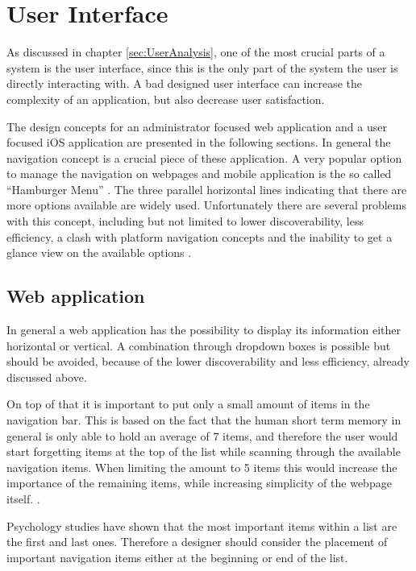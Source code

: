 \section{User Interface} %

As discussed in chapter \vref{sec:UserAnalysis}, one of the most crucial parts of a system is the user interface, since this is the only part of the system the user is directly interacting with. A bad designed user interface can increase the complexity of an application, but also decrease user satisfaction.

The design concepts for an administrator focused web application and a user focused iOS application are presented in the following sections. In general the navigation concept is a crucial piece of these application. A very popular option to manage the navigation on webpages and mobile application is the so called \enquote{Hamburger Menu} \cite{Abreu:2014aa}. The three parallel horizontal lines indicating that there are more options available are widely used. Unfortunately there are several problems with this concept, including but not limited to lower discoverability, less efficiency, a clash with platform navigation concepts and the inability to get a glance view on the available options \cite{Abreu:2014aa}.

\subsection{Web application}
\label{sec:UIConceptWeb}

In general a web application has the possibility to display its information either horizontal or vertical. A combination through dropdown boxes is possible but should be avoided, because of the lower discoverability and less efficiency, already discussed above. \cite{Crestodina:2015aa}

On top of that it is important to put only a small amount of items in the navigation bar. This is based on the fact that the human short term memory in general is only able to hold an average of 7 items, and therefore the user would start forgetting items at the top of the list while scanning through the available navigation items. When limiting the amount to 5 items this would increase the importance of the remaining items, while increasing simplicity of the webpage itself. \cite{Crestodina:2015aa}. 

Psychology studies have shown that the most important items within a list are the first and last ones. Therefore a designer should consider the placement of important navigation items either at the beginning or end of the list. \cite{Crestodina:2015aa}

